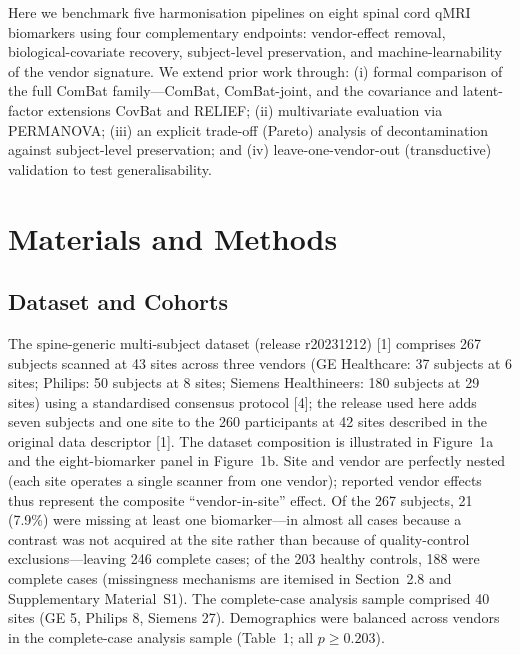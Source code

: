 \documentclass[12pt,a4paper]{article}
\begin{document}
Here we benchmark five harmonisation pipelines on eight spinal cord qMRI biomarkers using four complementary endpoints: vendor-effect removal, biological-covariate recovery, subject-level preservation, and machine-learnability of the vendor signature. We extend prior work through: (i) formal comparison of the full ComBat family---ComBat, ComBat-joint, and the covariance and latent-factor extensions CovBat and RELIEF; (ii) multivariate evaluation via PERMANOVA; (iii) an explicit trade-off (Pareto) analysis of decontamination against subject-level preservation; and (iv) leave-one-vendor-out (transductive) validation to test generalisability.

\section{Materials and Methods}

\subsection{Dataset and Cohorts}

The spine-generic multi-subject dataset (release r20231212) [1] comprises 267 subjects scanned at 43 sites across three vendors (GE Healthcare: 37 subjects at 6 sites; Philips: 50 subjects at 8 sites; Siemens Healthineers: 180 subjects at 29 sites) using a standardised consensus protocol [4]; the release used here adds seven subjects and one site to the 260 participants at 42 sites described in the original data descriptor [1]. The dataset composition is illustrated in Figure~1a and the eight-biomarker panel in Figure~1b. Site and vendor are perfectly nested (each site operates a single scanner from one vendor); reported vendor effects thus represent the composite ``vendor-in-site'' effect. Of the 267 subjects, 21 (7.9\%) were missing at least one biomarker---in almost all cases because a contrast was not acquired at the site rather than because of quality-control exclusions---leaving 246 complete cases; of the 203 healthy controls, 188 were complete cases (missingness mechanisms are itemised in Section~2.8 and Supplementary Material~S1). The complete-case analysis sample comprised 40 sites (GE 5, Philips 8, Siemens 27). Demographics were balanced across vendors in the complete-case analysis sample (Table~1; all $p\geq0.203$).
\end{document}
